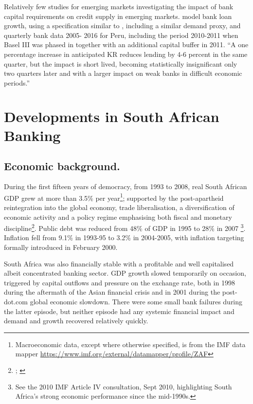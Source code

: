 \documentclass[
]{article}
\begin{document}
Relatively few studies for emerging markets investigating the impact of bank capital requirements on credit supply in emerging markets. \citet{fang2020bank} model bank loan growth, using a specification similar to \citet{aiyar2016does}, including a similar demand proxy, and quarterly bank data 2005- 2016 for Peru, including the period 2010-2011 when Basel III was phased in together with an additional capital buffer in 2011. ``A one percentage increase in anticipated KR reduces lending by 4-6 percent in the same quarter, but the impact is short lived, becoming statistically insignificant only two quarters later and with a larger impact on weak banks in difficult economic periods.''

\hypertarget{economic}{%
\section{Developments in South African Banking}\label{economic}}

\hypertarget{economic-background.}{%
\subsection{Economic background.}\label{economic-background.}}

During the first fifteen years of democracy, from 1993 to 2008, real South African GDP grew at more than 3.5\% per year\footnote{Macroeconomic data, except where otherwise specified, is from the IMF data mapper \url{https://www.imf.org/external/datamapper/profile/ZAF}}; supported by the post-apartheid reintegration into the global economy, trade liberalisation, a diversification of economic activity and a policy regime emphasising both fiscal and monetary discipline\footnote{\citet{nowak2005first}; \citet{nowak2006post}}. Public debt was reduced from 48\% of GDP in 1995 to 28\% in 2007 \footnote{See the 2010 IMF Article IV consultation, Sept 2010, highlighting South Africa's strong economic performance since the mid-1990s.}. Inflation fell from 9.1\% in 1993-95 to 3.2\% in 2004-2005, with inflation targeting formally introduced in February 2000.

South Africa was also financially stable with a profitable and well capitalised albeit concentrated banking sector. GDP growth slowed temporarily on occasion, triggered by capital outflows and pressure on the exchange rate, both in 1998 during the aftermath of the Asian financial crisis and in 2001 during the post-dot.com global economic slowdown. There were some small bank failures during the latter episode, but neither episode had any systemic financial impact and demand and growth recovered relatively quickly.
\end{document}
